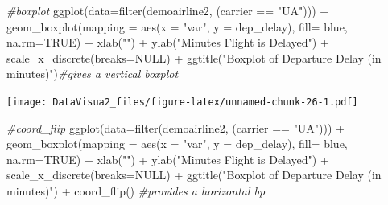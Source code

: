 \documentclass[
]{article}
\newenvironment{Shaded}{\begin{snugshade}}{\end{snugshade}}
\newcommand{\AttributeTok}[1]{\textcolor[rgb]{0.77,0.63,0.00}{#1}}
\newcommand{\CommentTok}[1]{\textcolor[rgb]{0.56,0.35,0.01}{\textit{#1}}}
\newcommand{\ConstantTok}[1]{\textcolor[rgb]{0.00,0.00,0.00}{#1}}
\newcommand{\FunctionTok}[1]{\textcolor[rgb]{0.00,0.00,0.00}{#1}}
\newcommand{\NormalTok}[1]{#1}
\newcommand{\SpecialCharTok}[1]{\textcolor[rgb]{0.00,0.00,0.00}{#1}}
\newcommand{\StringTok}[1]{\textcolor[rgb]{0.31,0.60,0.02}{#1}}
\begin{document}
\begin{Shaded}
\begin{Highlighting}[]
\CommentTok{\#boxplot}
\FunctionTok{ggplot}\NormalTok{(}\AttributeTok{data=}\FunctionTok{filter}\NormalTok{(demoairline2, (carrier }\SpecialCharTok{==} \StringTok{"UA"}\NormalTok{))) }\SpecialCharTok{+} \FunctionTok{geom\_boxplot}\NormalTok{(}\AttributeTok{mapping =} \FunctionTok{aes}\NormalTok{(}\AttributeTok{x =} \StringTok{"var"}\NormalTok{, }\AttributeTok{y =}\NormalTok{ dep\_delay), }\AttributeTok{fill=} \StringTok{\textquotesingle{}blue\textquotesingle{}}\NormalTok{, }\AttributeTok{na.rm=}\ConstantTok{TRUE}\NormalTok{) }\SpecialCharTok{+} \FunctionTok{xlab}\NormalTok{(}\StringTok{""}\NormalTok{) }\SpecialCharTok{+} \FunctionTok{ylab}\NormalTok{(}\StringTok{"Minutes Flight is Delayed"}\NormalTok{) }\SpecialCharTok{+} \FunctionTok{scale\_x\_discrete}\NormalTok{(}\AttributeTok{breaks=}\ConstantTok{NULL}\NormalTok{) }\SpecialCharTok{+} \FunctionTok{ggtitle}\NormalTok{(}\StringTok{"Boxplot of Departure Delay (in minutes)"}\NormalTok{)}\CommentTok{\#gives a vertical boxplot}
\end{Highlighting}
\end{Shaded}

\texttt{[image: DataVisua2\_files/figure-latex/unnamed-chunk-26-1.pdf]}

\begin{Shaded}
\begin{Highlighting}[]
\CommentTok{\#coord\_flip}
\FunctionTok{ggplot}\NormalTok{(}\AttributeTok{data=}\FunctionTok{filter}\NormalTok{(demoairline2, (carrier }\SpecialCharTok{==} \StringTok{"UA"}\NormalTok{))) }\SpecialCharTok{+} \FunctionTok{geom\_boxplot}\NormalTok{(}\AttributeTok{mapping =} \FunctionTok{aes}\NormalTok{(}\AttributeTok{x =} \StringTok{"var"}\NormalTok{, }\AttributeTok{y =}\NormalTok{ dep\_delay), }\AttributeTok{fill=} \StringTok{\textquotesingle{}blue\textquotesingle{}}\NormalTok{, }\AttributeTok{na.rm=}\ConstantTok{TRUE}\NormalTok{) }\SpecialCharTok{+} \FunctionTok{xlab}\NormalTok{(}\StringTok{""}\NormalTok{) }\SpecialCharTok{+} \FunctionTok{ylab}\NormalTok{(}\StringTok{"Minutes Flight is Delayed"}\NormalTok{) }\SpecialCharTok{+} \FunctionTok{scale\_x\_discrete}\NormalTok{(}\AttributeTok{breaks=}\ConstantTok{NULL}\NormalTok{) }\SpecialCharTok{+} \FunctionTok{ggtitle}\NormalTok{(}\StringTok{"Boxplot of Departure Delay (in minutes)"}\NormalTok{) }\SpecialCharTok{+} \FunctionTok{coord\_flip}\NormalTok{() }\CommentTok{\#provides a horizontal bp}
\end{Highlighting}
\end{Shaded}
\end{document}
